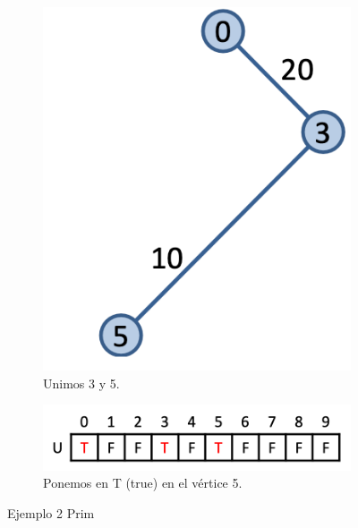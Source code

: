 \begin{figure}[h]
  \begin{minipage}{0.4\textwidth}
    \centering
    \begin{subfigure}{\textwidth}
      \centering
      \includegraphics[width=.5\textwidth]{assets/prim5.png}
      \caption{Unimos 3 y 5.}
    \end{subfigure}
  \end{minipage}
  \hfill
  \begin{minipage}{0.5\textwidth}
    \centering
    \begin{subfigure}{\textwidth}
      \centering
      \includegraphics[width=.8\textwidth]{assets/prim6.png}
      \caption{Ponemos en T (true) en el vértice 5.}
    \end{subfigure}
  \end{minipage}
  \caption{Ejemplo 2 Prim}
\end{figure}

